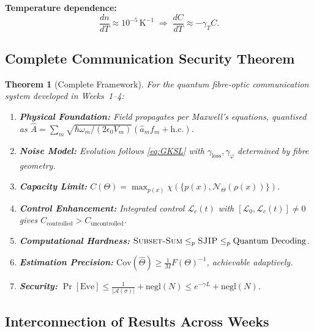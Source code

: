 \documentclass[journal,twocolumn]{IEEEtran}
\theoremstyle{definition}
\theoremstyle{plain}
\newtheorem{theorem}{Theorem}[section]
\begin{document}
\textbf{Temperature dependence:}
\begin{equation}
  \frac{dn}{dT}\approx10^{-5}\,\mathrm{K}^{-1}\;\Longrightarrow\;
  \frac{dC}{dT}\approx-\gamma_T C.
\end{equation}

\subsection{Complete Communication Security Theorem}

\begin{theorem}[Complete Framework]
For the quantum fibre-optic communication system developed in
Weeks~1--4:
\begin{enumerate}[label=(\arabic*), leftmargin=*, itemsep=2pt]
  \item \textbf{Physical Foundation:} Field propagates per Maxwell's
    equations, quantised as $\hat{A}=\sum_m\sqrt{\hbar\omega_m/
    (2\epsilon_0 V_m)}(\hat{a}_m f_m+\mathrm{h.c.})$.
  \item \textbf{Noise Model:} Evolution follows \cref{eq:GKSL} with
    $\gamma_{\mathrm{loss}},\gamma_\varphi$ determined by fibre
    geometry.
  \item \textbf{Capacity Limit:}
    $C(\Theta)=\max_{p(x)}\chi(\{p(x),\mathcal{N}_\Theta(\rho(x))\})$.
  \item \textbf{Control Enhancement:} Integrated control
    $\mathcal{L}_c(t)$ with $[\mathcal{L}_0,\mathcal{L}_c(t)]\ne0$
    gives $C_{\mathrm{controlled}}>C_{\mathrm{uncontrolled}}$.
  \item \textbf{Computational Hardness:}
    $\textsc{Subset-Sum}\le_p\textsc{SJIP}\le_p\text{Quantum Decoding}$.
  \item \textbf{Estimation Precision:}
    $\mathrm{Cov}(\hat\Theta)\ge\frac{1}{M}F(\Theta)^{-1}$,
    achievable adaptively.
  \item \textbf{Security:}
    $\Pr[\text{Eve}]\le\frac{1}{|\mathcal{A}(\sigma)|}
    +\mathrm{negl}(N)\le e^{-\gamma L}+\mathrm{negl}(N)$.
\end{enumerate}
\end{theorem}

\subsection{Interconnection of Results Across Weeks}
\end{document}
